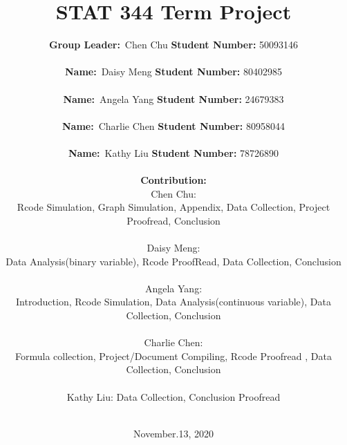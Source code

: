 \documentclass{article}
\begin{document}
\title{\textbf{STAT 344 Term Project}}\\
\date{November.13, 2020} 

\author{
\vspace{.4cm}

{\textbf{Group Leader:}}\ Chen Chu \hspace{\fill}
\textbf{Student Number:} 50093146  \\
\vspace{.4cm}

{\textbf{Name:}}\ Daisy Meng \hspace{\fill}
\textbf{Student Number:} 80402985  \\
\vspace{.4cm}

{\textbf{Name:}}\ Angela Yang\hspace{\fill}
\textbf{Student Number:} 24679383  \\
\vspace{.4cm}

{\textbf{Name:}}\ Charlie Chen \hspace{\fill}
\textbf{Student Number:} 80958044  \\
\vspace{.4cm}

{\textbf{Name:}}\ Kathy Liu \hspace{\fill}
\textbf{Student Number:} 78726890 \\
\vspace{.4cm}\\

\vspace{.1cm}
{\textbf{Contribution:}} \\
\vspace{.1cm}
Chen Chu: \\
Rcode Simulation, Graph Simulation, Appendix, Data Collection, Project Proofread, Conclusion \\
\vspace{.1cm}\\

Daisy Meng: \\
Data Analysis(binary variable), Rcode ProofRead, Data Collection, Conclusion \\
\vspace{.1cm}\\

Angela Yang: \\
Introduction, Rcode Simulation, Data Analysis(continuous variable), Data Collection, Conclusion \\
\vspace{.1cm}\\

Charlie Chen: \\
Formula collection, Project/Document Compiling, Rcode Proofread , Data Collection, Conclusion\\
\vspace{.1cm}\\

Kathy Liu: Data Collection, Conclusion Proofread\\ 
\vspace{.1cm}\\
}
\end{document}
